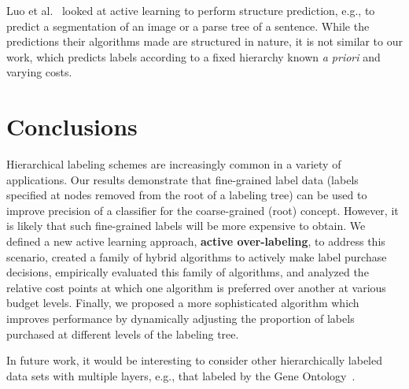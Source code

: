 \documentclass[10pt, conference, compsocconf]{IEEEtran}
\begin{document}
Luo et al.~\cite{lsu-lsal-13} looked at active learning to perform structure
prediction, e.g., to predict a segmentation of an image or a parse tree of a
sentence.  While the predictions their algorithms made are structured in
nature, it is not similar to our work, which predicts labels according to a
fixed hierarchy known {\em a priori} and varying costs.

\section{Conclusions}
\label{sec:concl}

Hierarchical labeling schemes are increasingly common in a variety
of applications.  Our results demonstrate that fine-grained label
data (labels specified at nodes removed from the root of a labeling
tree) can be used to improve precision of a classifier for the
coarse-grained (root) concept.  However, it is likely that such
fine-grained labels will be more expensive to obtain.  We defined
a new active learning approach, {\bf active over-labeling}, to address this scenario, created a family of
hybrid algorithms to actively make label purchase decisions, 
empirically evaluated this family of algorithms, and analyzed the 
relative cost points at which one algorithm is preferred over another
at various budget levels. Finally, we proposed a more sophisticated algorithm
which improves performance by dynamically adjusting the proportion of labels 
purchased at different levels of the labeling tree.

In future work, it would be
interesting to consider other hierarchically labeled data sets with multiple layers, e.g.,
that labeled by the Gene Ontology~\cite{GeneOntology}.





%
%
\end{document}
